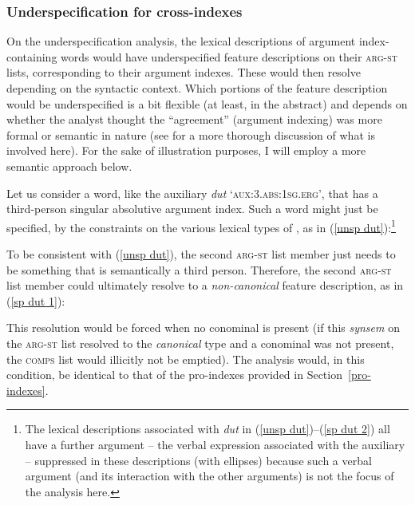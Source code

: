 \documentclass[output=paper
 	        ,biblatex
                ,babelshorthands
                ,newtxmath
                ,draftmode
                ,colorlinks, citecolor=brown
]{langscibook}
\begin{document}
\subsubsection{Underspecification for cross-indexes}

On the underspecification analysis, the lexical descriptions of argument index-containing words would have underspecified feature descriptions on their \textsc{arg-st} lists, corresponding to their argument indexes. These would then resolve depending on the syntactic context. Which portions of the feature description would be underspecified is a bit flexible (at least, in the abstract) and depends on whether the analyst thought the ``agreement'' (argument indexing) was more formal or semantic in nature (see  for a more thorough discussion of what is involved here). For the sake of illustration purposes, I will employ a more semantic approach below.

Let us consider a word, like the  auxiliary \textit{dut} `\textsc{aux:3.abs:1sg.erg}', that has a third-person singular absolutive argument index. Such a word might just be specified, by the constraints on the various lexical types of , as in (\ref{unsp dut}):\footnote{The lexical descriptions associated with \textit{dut} in (\ref{unsp dut})--(\ref{sp dut 2}) all have a further argument -- the verbal expression associated with the auxiliary -- suppressed in these descriptions (with ellipses) because such a verbal argument (and its interaction with the other arguments) is not the focus of the analysis here.}
%
\begin{exe}
\ex\label{unsp dut}
\end{exe}
%
To be consistent with (\ref{unsp dut}), the second \textsc{arg-st} list member just needs to be something that is semantically a third person. Therefore, the second \textsc{arg-st} list member could ultimately resolve to a \textit{non-canonical} feature description, as in (\ref{sp dut 1}): 
%
\begin{exe}
\ex\label{sp dut 1}
\end{exe}
%
This resolution would be forced when no conominal is present (if this \textit{synsem} on the \textsc{arg-st} list resolved to the \textit{canonical} type and a conominal was not present, the \textsc{comps} list would illicitly not be emptied). The analysis would, in this condition, be identical to that of the pro-indexes provided in Section~\ref{pro-indexes}.
\end{document}
